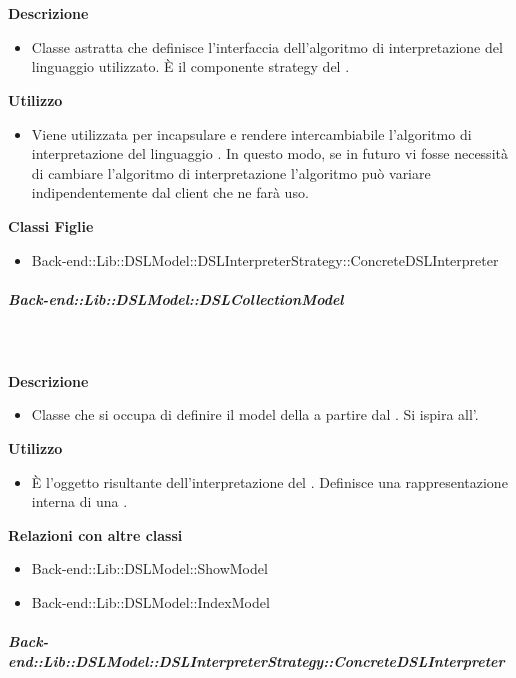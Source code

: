         \textbf{\\ \\ Descrizione} 
          \begin{itemize}
            \item[] Classe astratta che definisce l'interfaccia dell'algoritmo di interpretazione del linguaggio  utilizzato. È il componente strategy del  .
          \end{itemize}      
        \textbf{Utilizzo}  
          \begin{itemize}
            \item[] Viene utilizzata per incapsulare e rendere intercambiabile l'algoritmo di interpretazione del linguaggio . In questo modo, se in futuro vi fosse necessità di cambiare l'algoritmo di interpretazione l'algoritmo può variare indipendentemente dal client che ne farà uso.
          \end{itemize}
          \textbf{Classi Figlie}
          \begin{itemize}
              \item{Back-end::Lib::DSLModel::DSLInterpreterStrategy::ConcreteDSLInterpreter}
          \end{itemize}
      \subparagraph{Back-end::Lib::DSLModel::DSLCollectionModel}
        
        \textbf{\\ \\ Descrizione} 
          \begin{itemize}
            \item[] Classe che si occupa di definire il model della  a partire dal . Si ispira all'.
          \end{itemize}      
        \textbf{Utilizzo}  
          \begin{itemize}
            \item[] È l'oggetto risultante dell'interpretazione del . Definisce una rappresentazione interna di una .
          \end{itemize}
          \textbf{Relazioni con altre classi}
          \begin{itemize}
              \item{Back-end::Lib::DSLModel::ShowModel}
              \item{Back-end::Lib::DSLModel::IndexModel}
          \end{itemize}
      \subparagraph{Back-end::Lib::DSLModel::DSLInterpreterStrategy::ConcreteDSLInterpreter}
        
